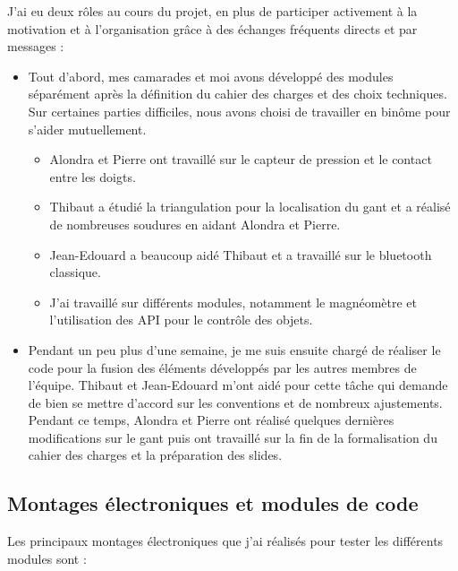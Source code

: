 \documentclass[10pt]{article}
\begin{document}
        J'ai eu deux rôles au cours du projet, en plus de participer activement à la motivation et à l'organisation grâce à des 
            échanges fréquents directs et par messages :
            \begin{itemize}
                \item Tout d'abord, mes camarades et moi avons développé des modules séparément après la définition du cahier des charges et des choix techniques.
                        Sur certaines parties difficiles, nous avons choisi de travailler en binôme pour s'aider mutuellement.
                        \begin{itemize}
                            \item Alondra et Pierre ont travaillé sur le capteur de pression et le contact entre les doigts.
                            \item Thibaut a étudié la triangulation pour la localisation du gant et a réalisé de nombreuses soudures
                                    en aidant Alondra et Pierre.
                            \item Jean-Edouard a beaucoup aidé Thibaut et a travaillé sur le bluetooth classique.
                            \item J'ai travaillé sur différents modules, notamment le magnéomètre et l'utilisation des API pour le contrôle des objets.
                        \end{itemize} 
                \item Pendant un peu plus d'une semaine, je me suis ensuite chargé de réaliser le code pour la fusion des éléments développés par les autres membres de l'équipe.
                        Thibaut et Jean-Edouard m'ont aidé pour cette tâche qui demande de bien se mettre d'accord sur les conventions et de nombreux ajustements.
                        Pendant ce temps, Alondra et Pierre ont réalisé quelques dernières modifications sur le gant 
                        puis ont travaillé sur la fin de la formalisation du cahier des charges
                            et la préparation des slides.
            \end{itemize}
               
        \subsection{Montages électroniques et modules de code}

            Les principaux montages électroniques que j'ai réalisés pour tester les différents modules sont :
\end{document}
